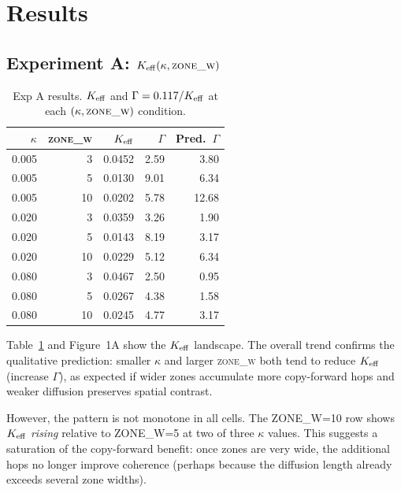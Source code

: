 \documentclass[11pt,a4paper]{article}
\begin{document}
\section{Results}
\label{sec:results}

\subsection{Experiment A: $K_{\rm eff}(\kappa, \textsc{zone\_w})$}

\begin{table}[h]
\centering
\caption{Exp A results. $K_{\rm eff}$ and $\Gamma = 0.117/K_{\rm eff}$ at each
  $(\kappa, \textsc{zone\_w})$ condition.}
\label{tab:expA}
\begin{tabular}{rr|rr|r}
\toprule
$\kappa$ & \textsc{zone\_w} & $K_{\rm eff}$ & $\Gamma$ & Pred.\ $\Gamma$ \\
\midrule
0.005 &  3 & 0.0452 & 2.59 &  3.80 \\
0.005 &  5 & 0.0130 & 9.01 &  6.34 \\
0.005 & 10 & 0.0202 & 5.78 & 12.68 \\
\midrule
0.020 &  3 & 0.0359 & 3.26 &  1.90 \\
0.020 &  5 & 0.0143 & 8.19 &  3.17 \\
0.020 & 10 & 0.0229 & 5.12 &  6.34 \\
\midrule
0.080 &  3 & 0.0467 & 2.50 &  0.95 \\
0.080 &  5 & 0.0267 & 4.38 &  1.58 \\
0.080 & 10 & 0.0245 & 4.77 &  3.17 \\
\bottomrule
\end{tabular}
\end{table}

Table~\ref{tab:expA} and Figure~1A show the $K_{\rm eff}$ landscape.
The overall trend confirms the qualitative prediction: smaller $\kappa$ and larger
\textsc{zone\_w} both tend to reduce $K_{\rm eff}$ (increase $\Gamma$), as expected if
wider zones accumulate more copy-forward hops and weaker diffusion preserves spatial
contrast.

However, the pattern is not monotone in all cells.  The ZONE\_W=10 row shows
$K_{\rm eff}$ \emph{rising} relative to ZONE\_W=5 at two of three $\kappa$ values.
This suggests a saturation of the copy-forward benefit: once zones are very wide, the
additional hops no longer improve coherence (perhaps because the diffusion length
already exceeds several zone widths).
\end{document}
